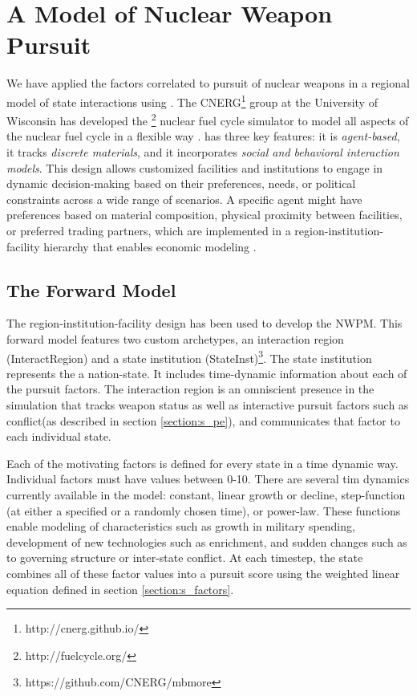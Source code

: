 \section{A \Cyclus Model of Nuclear Weapon Pursuit}
\label{s_methods}

We have applied the factors correlated to pursuit of nuclear weapons in a regional model of state interactions using \Cyclus\cite{huff_open_2011,huff_fundamental_2016,gidden_agent-based_2013}.  The \gls{CNERG}\footnote{http://cnerg.github.io/} group at the University of Wisconsin has developed the \Cyclus\footnote{http://fuelcycle.org/} nuclear fuel cycle simulator to model all aspects of the nuclear fuel cycle in a flexible way \cite{cyclus_v1_3}.  \Cyclus has three key features: it is \textit{agent-based}, it tracks \textit{discrete materials}, and it incorporates \textit{social and behavioral interaction models}\cite{jennings_agent-based_2000, taylor2014agent}. This design allows customized facilities and institutions to engage in dynamic decision-making based on their preferences, needs, or political constraints across a wide range of scenarios.  A specific agent might have preferences based on material composition, physical proximity between facilities, or preferred trading partners, which are implemented in a region-institution-facility hierarchy that enables economic modeling \cite{oliver_geniusv2:_2009}.

\subsection{The Forward Model}

The region-institution-facility design has been used to develop the \gls{NWPM}. This forward model features two custom archetypes, an interaction region (InteractRegion) and a state institution (StateInst)\footnote{https://github.com/CNERG/mbmore}.  The state institution represents the a nation-state.  It includes time-dynamic information about each of the pursuit factors. The interaction region is an omniscient presence in the simulation that tracks weapon status as well as interactive pursuit factors such as conflict(as described in section \ref{section:s_pe}), and communicates that factor to each individual state. 

Each of the motivating factors is defined for every state in a time dynamic way. Individual factors must have values between 0-10. There are several tim dynamics currently available in the model: constant, linear growth or decline, step-function (at either a specified or a randomly chosen time), or power-law.  These functions enable modeling of characteristics such as growth in military spending, development of new technologies such as enrichment, and sudden changes such as to governing structure or inter-state conflict.  At each timestep, the state combines all of these factor values into a pursuit score using the weighted linear equation defined in section \ref{section:s_factors}.

